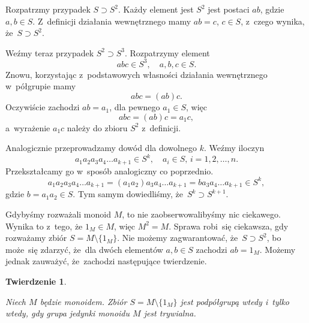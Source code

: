 \documentclass[a4paper,11pt]{article}
\newtheorem{theorem}{Twierdzenie}  %
\begin{document}
Rozpatrzmy przypadek $S \supset S^{ 2 }$. Każdy element jest $S^{ 2 }$ jest
postaci $ab$, gdzie $a, b \in S$. Z~definicji działania wewnętrznego mamy
$ab = c$, $c \in S$, z~czego wynika, że~$S \supset S^{ 2 }$.

Weźmy teraz przypadek $S^{ 2 } \supset S^{ 3 }$. Rozpatrzymy element
\begin{equation}
  \label{eq:Forys-Forys-23}
  abc \in S^{ 3 }, \quad a, b, c \in S.
\end{equation}
Znowu, korzystając z~podstawowych własności działania wewnętrznego
w~półgrupie mamy
\begin{equation}
  \label{eq:Forys-Forys-24}
  abc = ( ab ) c.
\end{equation}
Oczywiście zachodzi $ab = a_{ 1 }$, dla pewnego $a_{ 1 } \in S$, więc
\begin{equation}
  \label{eq:Forys-Forys-25}
  abc = ( ab ) c = a_{ 1 } c,
\end{equation}
a~wyrażenie $a_{ 1 } c$ należy do zbioru $S^{ 2 }$ z~definicji.

Analogicznie przeprowadzamy dowód dla dowolnego $k$. Weźmy iloczyn
\begin{equation}
  \label{eq:Forys-Forys-26}
  a_{ 1 } a_{ 2 } a_{ 3 } a_{ 4 } \ldots a_{ k + 1 } \in S^{ k }, \quad
  a_{ i } \in S,\, i = 1, 2, \ldots, n.
\end{equation}
Przekształcamy go w~sposób analogiczny co poprzednio.
\begin{equation}
  \label{eq:Forys-Forys-27}
  a_{ 1 } a_{ 2 } a_{ 3 } a_{ 4 } \ldots a_{ k + 1 } =
  ( a_{ 1 } a_{ 2 } ) a_{ 3 } a_{ 4 } \ldots a_{ k + 1 } =
  b a_{ 3 } a_{ 4 } \ldots a_{ k + 1 } \in S^{ k },
\end{equation}
gdzie $b = a_{ 1 } a_{ 2 } \in S$. Tym samym dowiedliśmy,
że~$S^{ k } \supset S^{ k + 1 }$.

Gdybyśmy rozważali monoid $M$, to nie zaobserwowalibyśmy nic ciekawego.
Wynika to z~tego, że $1_{ M } \in M$, więc $M^{ 2 } = M$. Sprawa robi~się
ciekawsza, gdy rozważamy zbiór $S = M \setminus \{ 1_{ M } \}$. Nie możemy
zagwarantować, że~$S \supset S^{ 2 }$, bo może~się zdarzyć, że~dla dwóch
elementów $a, b \in S$ zachodzi $a b = 1_{ M }$. Możemy jednak zauważyć,
że~zachodzi następujące twierdzenie.





\begin{theorem}
  \label{thm:Forys-Forys-01}

  Niech $M$ będzie monoidem. Zbiór $S = M \setminus \{ 1_{ M } \}$ jest podpółgrupą
  wtedy i~tylko wtedy, gdy grupa jedynki monoidu $M$ jest trywialna.

\end{theorem}
\end{document}
